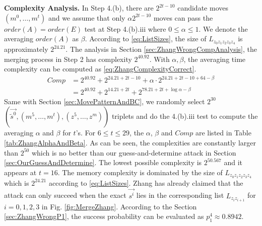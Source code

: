 \noindent\textbf{Complexity Analysis. }
In Step 4.(b), there are $2^{2t-10}$ candidate moves $(m^0,\ldots, m^{t})$ and we assume that only $\alpha 2^{2t-10}$ moves can pass the $order(A)=order(E)$ test at Step 4.(b).iii where $0\leq \alpha \leq 1$.
We denote the averaging $order(A)$ as $\beta $.
According to \eqref{eq:ListSizes}, the size of $L_{z_0z_1z_2z_3z_4}$ is approximately $2^{24.21}$.
The analysis in Section \ref{sec:ZhangWrongCompAnalysis}, the merging process in Step 2 has complexity $2^{40.92}$.
With $\alpha ,\beta $, the averaging time complexity can be computed as \eqref{eq:ZhangComplexityCorrect}.
\begin{equation}\label{eq:ZhangComplexityCorrect}
\begin{aligned}
Comp&=2^{40.92}+2^{24.21+2t-10}+\alpha \cdot 2^{24.21+2t-10+64-\beta}\\
&=2^{40.92}+2^{14.21+2t}+2^{78.21+2t+\log \alpha -\beta}
\end{aligned}
\end{equation}
Same with Section \ref{sec:MovePatternAndBC}, we randomly select $2^{30}$ $\left(\vec{\tilde{s}^0}, (m^5,\ldots, m^t), (z^5,\ldots, z^m)\right)$ triplets and do the 4.(b).iii test to compute the averaging $\alpha$ and $\beta$ for $t$'s.
For $6\leq t\leq 29$, the $\alpha$, $\beta$ and $Comp$ are listed in Table \ref{tab:ZhangAlphaAndBeta}.
As can be seen, the complexities are constantly larger than $2^{50}$ which is no better than our guess-and-determine attack in Section \ref{sec:OurGuessAndDetermine}. 
The lowest possible complexity is $2^{50.567}$ and it appears at $t=16$. 
The memory complexity is dominated by the size of $L_{z_0z_1z_2z_3z_4}$ which is $2^{24.21}$ according to \eqref{eq:ListSizes}.
Zhang \etal has already claimed that the attack can only succeed when the exact $\vec{s^i}$ lies in the corresponding list $L_{z_iz_{i+1}}$ for $i=0,1,2,3$ in Fig. \ref{fig:MergeZhang}.
According to the Section \ref{sec:ZhangWrongP1}, the success probability can be evaluated as $p_1^4\approx 0.8942$.



